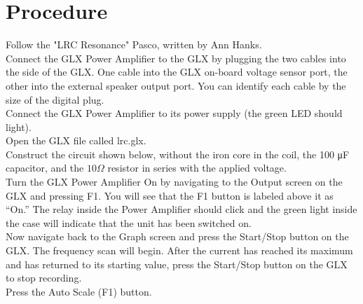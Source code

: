 \documentclass[11pt]{article}
\begin{document}
\section*{Procedure}
Follow the "LRC Resonance" Pasco, written by Ann Hanks.\\

\noindent Connect the GLX Power Amplifier to the GLX by plugging the two cables into the side of the GLX. One cable into the GLX on-board voltage sensor port, the other into the external speaker output port. You can identify each cable by the size of the digital plug.\\

\noindent Connect the GLX Power Amplifier to its power supply (the green LED should light).\\

\noindent Open the GLX file called lrc.glx.\\

\noindent Construct the circuit shown below, without the iron core in the coil, the 100 μF capacitor, and the $10\Omega$ resistor in series with the applied voltage.\\

\noindent Turn the GLX Power Amplifier On by navigating to the Output screen on the GLX and pressing F1. You will see that the F1 button is labeled above it as “On.” The relay inside the Power Amplifier should click and the green light inside the case will indicate that the unit has been switched on.\\

\noindent Now navigate back to the Graph screen and press the Start/Stop button on the GLX. The frequency scan will begin. After the current has reached its maximum and has returned to its starting value, press the Start/Stop button on the GLX to stop recording.\\

\noindent Press the Auto Scale (F1) button.
\end{document}
